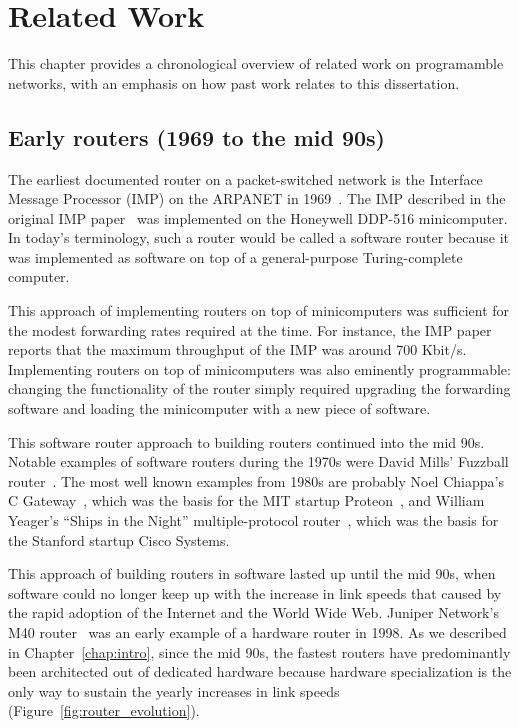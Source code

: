 \chapter{Related Work}
\label{chap:related}

This chapter provides a chronological overview of related work on programamble
networks, with an emphasis on how past work relates to this dissertation.

\section{Early routers (1969 to the mid 90s)}
The earliest documented router on a packet-switched network is the Interface
Message Processor (IMP) on the ARPANET in 1969~\cite{imp}. The IMP described in
the original IMP paper~\cite{imp} was implemented on the Honeywell DDP-516
minicomputer. In today's terminology, such a router would be called a software
router because it was implemented as software on top of a general-purpose
Turing-complete computer.

This approach of implementing routers on top of minicomputers was sufficient
for the modest forwarding rates required at the time. For instance, the IMP
paper reports that the maximum throughput of the IMP was around 700 Kbit/s.
Implementing routers on top of minicomputers was also eminently programmable:
changing the functionality of the router simply required upgrading the
forwarding software and loading the minicomputer with a new piece of software.

This software router approach to building routers continued into the mid 90s.
Notable examples of software routers during the 1970s were David Mills'
Fuzzball router~\cite{fuzzball}. The most well known examples from 1980s are
probably Noel Chiappa's C Gateway~\cite{cgw}, which was the basis for the MIT
startup Proteon~\cite{proteon}, and William Yeager's ``Ships in the Night''
multiple-protocol router~\cite{ships}, which was the basis for the Stanford
startup Cisco Systems.

This approach of building routers in software lasted up until the mid 90s, when
software could no longer keep up with the increase in link speeds that caused
by the rapid adoption of the Internet and the World Wide Web. Juniper Network's
M40 router~\cite{juniperm40} was an early example of a hardware router in 1998.
As we described in Chapter~\ref{chap:intro}, since the mid 90s, the fastest
routers have predominantly been architected out of dedicated hardware because
hardware specialization is the only way to sustain the yearly increases in link
speeds (Figure~\ref{fig:router_evolution}).

